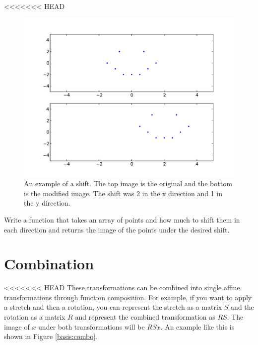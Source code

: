 <<<<<<< HEAD
\begin{figure}
\centering
\includegraphics[width=\textwidth]{shift.pdf}
\caption{An example of a shift. The top image is the original and the bottom is the modified image. The shift was 2 in the x direction and 1 in the y direction.}
\end{figure}

\begin{problem}
Write a function that takes an array of points and how much to shift them in each direction and returns the image of the points under the desired shift.
\end{problem}

\section*{Combination}
<<<<<<< HEAD
These transformations can be combined into single affine transformations through function composition.
For example, if you want to apply a stretch and then a rotation, you can represent the stretch as a matrix $S$ and the rotation as a matrix $R$ and represent the combined transformation as $R S$.
The image of $x$ under both transformations will be $R S x$.
An example like this is shown in Figure \ref{basis:combo}.



